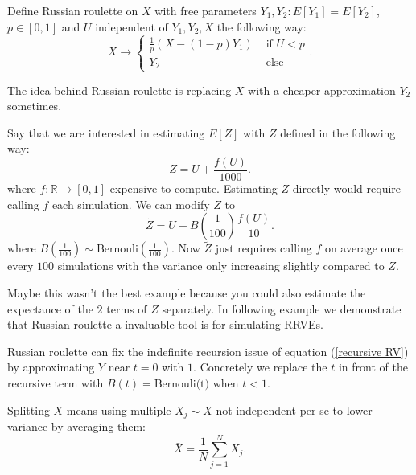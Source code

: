 \documentclass[a4paper,12pt]{article}
\begin{document}
\begin{definition} \label{Russian roulette}
    Define Russian roulette on $X$ with free parameters
    $Y_{1},Y_{2}: E[Y_{1}] = E[Y_{2}]$, $p \in [0,1]$ and $U$
    independent of $Y_{1},Y_{2},X$ the following way:
    \[
        X \rightarrow \begin{cases}
            \frac{1}{p}(X- (1-p)Y_{1}) & \text{ if } U<p \\
            Y_{2}                      & \text{ else }
        \end{cases}
        .\]
\end{definition}
The idea behind Russian roulette is replacing $X$ with a cheaper approximation $Y_{2}$
sometimes.

\begin{example}
    Say that we are interested in estimating $E[Z]$ with $Z$
    defined in the following way:
    \[
        Z = U + \frac{f(U)}{1000}
        .\]
    where $f:\mathbb{R} \rightarrow [0,1]$ expensive to compute.
    Estimating $Z$ directly would require calling $f$ each
    simulation. We can modify $Z$ to
    \[
        \tilde{Z} = U + B\left(\frac{1}{100}\right)\frac{f(U)}{10}
        .\]
    where $B(\frac{1}{100}) \sim \text{Bernouli}(\frac{1}{100})$. Now $\tilde{Z}$
    just requires calling $f$ on average once every $100$ simulations with the variance
    only increasing slightly compared to $Z$.
\end{example}

Maybe this wasn't the best example because you could also estimate the expectance of the
$2$ terms of $Z$ separately. In following example we demonstrate
that Russian roulette a invaluable tool is for simulating RRVEs.

\begin{example}
    Russian roulette can fix the indefinite recursion issue of
    equation (\ref{recursive RV}) by approximating $Y$ near $t = 0$ with $1$. Concretely
    we replace the $t$ in front of the recursive term with $B(t) = \text{Bernouli(t)}$
    when $t<1$.
\end{example}

\vspace{0.2cm}

\begin{python}
\end{python}

\begin{definition}[splitting]
    Splitting $X$ means using multiple $X_{j} \sim X$ not independent per se to
    lower variance by averaging them:
    \[
        \bar{X}= \frac{1}{N} \sum_{j=1}^{N} X_{j}
        .\]
\end{definition}
\end{document}
